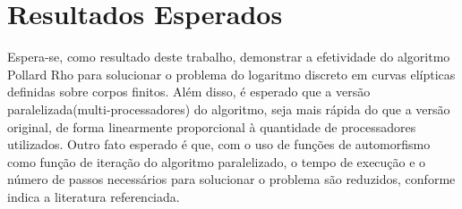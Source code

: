 \chapter{Resultados Esperados}

Espera-se, como resultado deste trabalho, demonstrar a efetividade do algoritmo Pollard Rho para solucionar o problema do logaritmo discreto em curvas elípticas definidas sobre corpos finitos. Além disso, é esperado que a versão paralelizada(multi-processadores) do algoritmo, seja mais rápida do que a versão original, de forma linearmente proporcional à quantidade de processadores utilizados.
Outro fato esperado é que, com o uso de funções de automorfismo como função de iteração do algoritmo paralelizado, o tempo de execução e o número de passos necessários para solucionar o problema são reduzidos, conforme indica a literatura referenciada.
